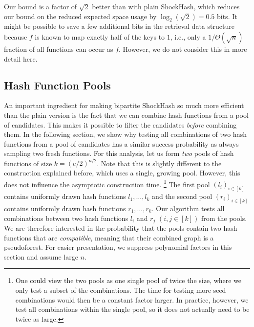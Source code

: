 \documentclass[a4paper,USenglish,cleveref]{lipics-v2021}
\begin{document}
Our bound is a factor of $\sqrt{2}$ better than with plain ShockHash, which reduces our bound on the reduced expected space usage by $\log_2(\sqrt{2})=0.5$ bits.
It might be possible to save a few additional bits in the retrieval data structure because $f$ is known to map exactly half of the keys to $1$, i.e., only a $1/\Theta(\sqrt{n})$ fraction of all functions can occur as $f$.
However, we do not consider this in more detail here.

\subsection{Hash Function Pools}\label{ss:pooling}
An important ingredient for making bipartite ShockHash so much more efficient than the plain version is the fact that we can combine hash functions from a pool of candidates.
This makes it possible to filter the candidates \emph{before} combining them.
In the following section, we show why testing all combinations of two hash functions from a pool of candidates has a similar success probability as always sampling two fresh functions.
For this analysis, let us form \emph{two} pools of hash functions of size $k=(e/2)^{n/2}$.
Note that this is slightly different to the construction explained before, which uses a single, growing pool.
However, this does not influence the asymptotic construction time.%
\footnote{%
  One could view the two pools as one single pool of twice the size, where we only test a subset of the combinations.
  The time for testing more seed combinations would then be a constant factor larger.
  In practice, however, we test all combinations within the single pool, so it does not actually need to be twice as large.
}
The first pool $(l_i)_{i\in[k]}$ contains uniformly drawn hash functions $l_1,\ldots,l_k$ and the second pool $(r_i)_{i\in[k]}$ contains uniformly drawn hash functions $r_1,\ldots,r_k$.
Our algorithm tests all combinations between two hash functions $l_i$ and $r_j$ $(i,j \in [k])$ from the pools.
We are therefore interested in the probability that the pools contain two hash functions that are \emph{compatible}, meaning that their combined graph is a pseudoforest.
For easier presentation, we suppress polynomial factors in this section and assume large $n$.
%

\def\PF{\mathrm{PF}}
\def\uniform{\mathcal{U}}
\def\expect{\mathbb{E}}
\def\H{\mathcal{H}}
\def\HProm{\mathcal{H}_{\textrm{promisc}}}
  \def\B{\mathcal{B}}
\end{document}
